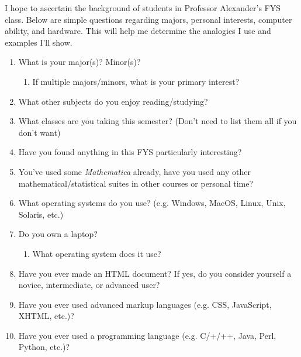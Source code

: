 \documentclass{article}
\begin{document}
I hope to ascertain the background of students in Professor Alexander's FYS class. Below are simple questions regarding majors, personal interests, computer ability, and hardware. This will help me determine the analogies I use and examples I'll show.

\begin{enumerate}

\item What is your major(s)? Minor(s)?

	\begin{enumerate}

		\item If multiple majors/minors, what is your primary interest?
\\	
	\end{enumerate}

\item What other subjects do you enjoy reading/studying?
\\
\item What classes are you taking this semester? (Don't need to list them all if you don't want)
\\
\item Have you found anything in this FYS particularly interesting?
\\
\item You've used some \textit{Mathematica} already, have you used any other mathematical/statistical suites in other courses or personal time?
\\
\item What operating systems do you use? (e.g. Windows, MacOS, Linux, Unix, Solaris, etc.)
\\
\item Do you own a laptop?
\\
	\begin{enumerate}

		\item What operating system does it use?
\\		
	\end{enumerate}

\item Have you ever made an HTML document? If yes, do you consider yourself a novice, intermediate, or advanced user?
\\
\item Have you ever used advanced markup languages (e.g. CSS, JavaScript, XHTML, etc.)?
\\
\item Have you ever used a programming language (e.g. C/+/++, Java, Perl, Python, etc.)?
\\
\end{enumerate}
\end{document}
